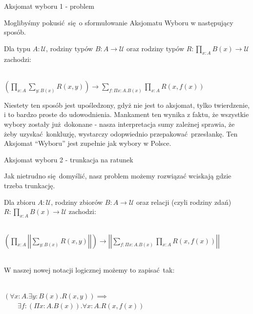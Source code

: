 \documentclass{beamer}
\newcommand{\U}{\mathcal{U}}
\begin{document}
\begin{frame}{Aksjomat wyboru 1 - problem}

Moglibyśmy pokusić się o sformułowanie Aksjomatu Wyboru w następujący sposób.

\begin{theorem}
Dla typu $A : \U$, rodziny typów $B : A \to \U$ oraz rodziny typów $R : \prod_{x : A} B(x) \to \U$ zachodzi: \\~\

$\displaystyle
	\left(\prod_{x : A} \sum_{y : B(x)} R(x, y)\right) \to
	\sum_{f : \Pi x : A. B(x)} \prod_{x : A} R(x, f(x))
$
\end{theorem}

Niestety ten sposób jest upośledzony, gdyż nie jest to aksjomat, tylko twierdzenie, i to bardzo proste do udowodnienia. Mankament ten wynika z faktu, że wszystkie wybory zostały już dokonane - nasza interpretacja sumy zależnej sprawia, że żeby uzyskać konkluzję, wystarczy odopwiednio przepakować przesłankę. Ten Aksjomat ``Wyboru'' jest zupełnie jak wybory w Polsce.

\end{frame}

\begin{frame}{Aksjomat wyboru 2 - trunkacja na ratunek}

Jak nietrudno się domyślić, nasz problem możemy rozwiązać wciskają gdzie trzeba trunkację.

\begin{definition}
Dla zbioru $A : \U$, rodziny zbiorów $B : A \to \U$ oraz relacji (czyli rodziny zdań) $R : \prod_{x : A} B(x) \to \U$ zachodzi: \\~\

$\displaystyle
	\left(\prod_{x : A} \left|\left|\sum_{y : B(x)} R(x, y)\right|\right|\right) \to
	\left|\left|\sum_{f : \Pi x : A. B(x)} \prod_{x : A} R(x, f(x))\right|\right|
$ \\~\

W naszej nowej notacji logicznej możemy to zapisać tak: \\~\

$\displaystyle
	(\forall x : A. \exists y : B(x). R(x, y)) \implies
$ \\
$\displaystyle \qquad
	\exists f : (\Pi x : A. B(x)). \forall x : A. R(x, f(x))
$
\end{definition}

\end{frame}
\end{document}
